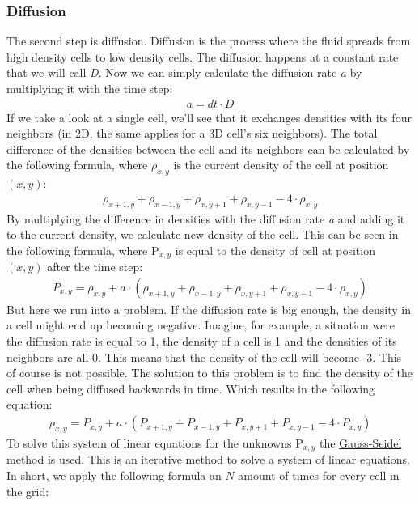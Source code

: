 \documentclass[a4paper,12pt,titlepage]{article}
\begin{document}
\subsubsection{Diffusion} \label{diffusion}
The second step is diffusion.
Diffusion is the process where the fluid spreads from high density cells to low density cells.
The diffusion happens at a constant rate that we will call \textit{D}. 
Now we can simply calculate the diffusion rate \textit{a} by multiplying it with the time step:
\[
\begin{array}{ll}
  a = dt \cdot D
\end{array}
\]
If we take a look at a single cell, we'll see that it exchanges densities with its four neighbors (in 2D, the same applies for a 3D cell's six neighbors).
The total difference of the densities between the cell and its neighbors can be calculated by the following formula,
where $\rho_{x, y}$ is the current density of the cell at position $(x, y)$:
\[
\begin{array}{ll}
	\rho_{x+1, y} + \rho_{x-1, y} + \rho_{x, y+1} + \rho_{x, y-1} - 4 \cdot \rho_{x, y}
\end{array}
\]
By multiplying the difference in densities with the diffusion rate \textit{a} and adding it to the current density, we calculate new density of the cell. 
This can be seen in the following formula, where P$_{x, y}$ is equal to the density of cell at position $(x, y)$ after the time step:
\[
\begin{array}{ll}
	P_{x, y} = \rho_{x, y} + a \cdot (\rho_{x+1, y} + \rho_{x-1, y} + \rho_{x, y+1} + \rho_{x, y-1} - 4 \cdot \rho_{x, y})
\end{array}
\]
But here we run into a problem. If the diffusion rate is big enough, the density in a cell might end up becoming negative.
Imagine, for example, a situation were the diffusion rate is equal to 1,  the density of a cell is 1 and the densities of its neighbors are all 0. This means that the density of the cell will become -3.
This of course is not possible.
The solution to this problem is to find the density of the cell when being diffused backwards in time. Which results in the following equation:
\[
\begin{array}{ll}
	\rho_{x, y} = P_{x, y} + a \cdot (P_{x+1, y} + P_{x-1, y} + P_{x, y+1} + P_{x, y-1} - 4 \cdot P_{x, y})
\end{array}	
\]
To solve this system of linear equations for the unknowns P$_{x, y}$ the \href{https://en.wikipedia.org/wiki/Gauss–Seidel_method}{Gauss-Seidel method} is used.
This is an iterative method to solve a system of linear equations. In short, we apply the following formula an $N$ amount of times for every cell in the grid:
\end{document}
